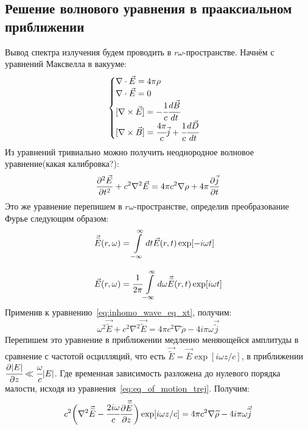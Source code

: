 \documentclass[14pt,a4paper]{extarticle}
\numberwithin{equation}{section}
\begin{document}
\subsection{Решение волнового уравнения в прааксиальном приближении}
Вывод спектра излучения будем проводить в $r\omega$-пространстве. Начнём с уравнений Максвелла в вакууме:
\begin{equation}
	\begin{cases}
		\nabla \cdot \vec{E} = 4\pi \rho\\
		\nabla \cdot \vec{E} = 0\\
		[\nabla \times \vec{E}] = -\cfrac{1}{c} \cfrac{d\vec{B}}{dt}\\
		[\nabla \times \vec{B}] = \cfrac{4\pi}{c} \vec{j} + \cfrac{1}{c} \cfrac{d\vec{D}}{dt}
	\end{cases} 
\end{equation}
Из уравнений тривиально можно получить неоднородное волновое уравнение(какая калибровка?): 
\begin{equation}
	\label{eq:inhomo_wave_eq_xt}
	\pdv[2]{\vec{E}}{t} + c^2 \nabla^2 \vec{E} = 4\pi c^2 \nabla \rho + 4\pi \pdv{\vec{j}}{t}
\end{equation}
Это же уравнение перепишем в $r\omega$-пространстве, определив преобразование Фурье следующим образом:
\begin{equation}
	\label{eq:Fourier_wt}
	\begin{array}{lcl}
		\vec{\widetilde{E}}(r, \omega) = \displaystyle\int\limits_{-\infty}^{\infty} dt \vec{E}(r, t)\exp[-i\omega t]\\
		\\
		\vec{E}(r, \omega) = \cfrac{1}{2\pi}\displaystyle\int\limits_{-\infty}^{\infty} d\omega \vec{\widetilde{E}}(r, t)\exp[i\omega t]
	\end{array}
\end{equation}
Применив к уравнению~\ref{eq:inhomo_wave_eq_xt}, получим:
\begin{equation}
	\omega^2 \vec{\widetilde{E}} + c^2 \nabla^2 \vec{\widetilde{E}} = 4\pi c^2 \nabla  \widetilde{\rho} - 4i\pi\omega\vec{\widetilde{j}}
\end{equation}
Перепишем это уравнение в приближении медленно меняющейся амплитуды в сравнение с частотой осцилляций, что есть $\vec{\widetilde{E}} =  \vec{\overline{E}}\exp[i\omega z/c]$, в приближении $\cfrac{\partial |E|}{\partial z} \ll \cfrac{\omega}{c}|E|$. Где временная зависимость разложена до нулевого порядка малости, исходя из уравнения~\ref{eq:eq_of_motion_trej}. Получим:
\begin{equation}
	\label{eq:wave_slow_vary}
	c^2\bigg(\nabla^2 \vec{\widetilde{E}} - \cfrac{2i\omega}{c}\pdv{\vec{\widetilde{E}}}{z}\bigg)\exp[i\omega z/c] = 4\pi c^2 \nabla  \widetilde{\rho} - 4i\pi\omega\vec{\widetilde{j}}
\end{equation}
\end{document}
